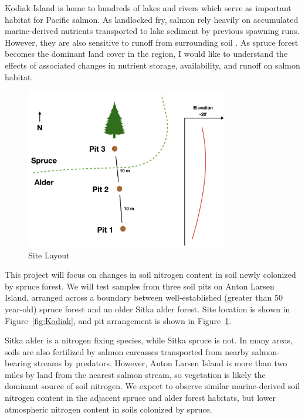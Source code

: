 \documentclass[hidelinks, 12pt]{article}
\begin{document}
Kodiak Island is home to hundreds of lakes and rivers which serve as important habitat for Pacific salmon. As landlocked fry, salmon rely heavily on accumulated marine-derived nutrients transported to lake sediment by previous spawning runs. However, they are also sensitive to runoff from surrounding soil \cite{Naiman2002, ChalonerMarineNitrogen}. As spruce forest becomes the dominant land cover in the region, I would like to understand the effects of associated changes in nutrient storage, availability, and runoff on salmon habitat.

\begin{figure}
    \includegraphics[width=3.5in]{Sitediagram.png}
    \caption{Site Layout}
    \label{fig:sitediagram}
\end{figure}

This project will focus on changes in soil nitrogen content in soil newly colonized by spruce forest. We will test samples from three soil pits on Anton Larsen Island, arranged across a boundary between well-established (greater than 50 year-old) spruce forest and an older Sitka alder forest. Site location is shown in Figure~\ref{fig:Kodiak}, and pit arrangement is shown in Figure~\ref{fig:sitediagram}.

Sitka alder is a nitrogen fixing species, while Sitka spruce is not. In many areas, soils are also fertilized by salmon carcasses transported from nearby salmon-bearing streams by predators. However, Anton Larsen Island is more than two miles by land from the nearest salmon stream, so vegetation is likely the dominant source of soil nitrogen. We expect to observe similar marine-derived soil nitrogen content in the adjacent spruce and alder forest habitats, but lower atmospheric nitrogen content in soils colonized by spruce.
\end{document}
